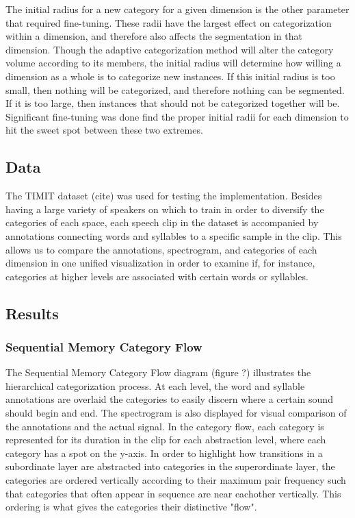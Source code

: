 \documentclass[runningheads]{llncs}
\begin{document}
The initial radius for a new category for a given dimension is the other parameter that required fine-tuning.  These radii have the largest effect on categorization within a dimension, and therefore also affects the segmentation in that dimension.  Though the adaptive categorization method will alter the category volume according to its members, the initial radius will determine how willing a dimension as a whole is to categorize new instances.  If this initial radius is too small, then nothing will be categorized, and therefore nothing can be segmented.  If it is too large, then instances that should not be categorized together will be.  Significant fine-tuning was done find the proper initial radii for each dimension to hit the sweet spot between these two extremes.

\subsection{Data}

The TIMIT dataset (cite) was used for testing the implementation.  Besides having a large variety of speakers on which to train in order to diversify the categories of each space, each speech clip in the dataset is accompanied by annotations connecting words and syllables to a specific sample in the clip.  This allows us to compare the annotations, spectrogram, and categories of each dimension in one unified visualization in order to examine if, for instance, categories at higher levels are associated with certain words or syllables.

\subsection{Results}

\subsubsection{Sequential Memory Category Flow}

The Sequential Memory Category Flow diagram (figure ?) illustrates the hierarchical categorization process. At each level, the word and syllable annotations are overlaid the categories to easily discern where a certain sound should begin and end.  The spectrogram is also displayed for visual comparison of the annotations and the actual signal.  In the category flow, each category is represented for its duration in the clip for each abstraction level, where each category has a spot on the y-axis.  In order to highlight how transitions in a subordinate layer are abstracted into categories in the superordinate layer, the categories are ordered vertically according to their maximum pair frequency such that categories that often appear in sequence are near eachother vertically.  This ordering is what gives the categories their distinctive "flow".
\end{document}
